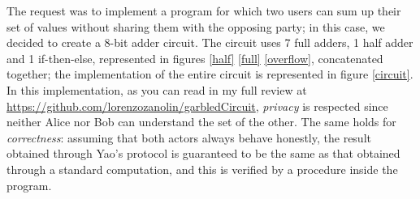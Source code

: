 \documentclass[12pt]{article}
\begin{document}
The request was to implement a program for which two users can sum up their set of values without sharing them with the opposing party; in this case, we decided to create a 8-bit adder circuit.
The circuit uses 7 full adders, 1 half adder and 1 if-then-else, represented in figures \ref{half} \ref{full} \ref{overflow}, concatenated together; the implementation of the entire circuit is represented in figure \ref{circuit}.
In this implementation, as you can read in my full review at \url{https://github.com/lorenzozanolin/garbledCircuit}\label{zanoGit}, \textit{privacy} is respected since neither Alice nor Bob can understand the set of the other. The same holds for \textit{correctness}: assuming that both actors always behave honestly, the result obtained through Yao's protocol is guaranteed to be the same as that obtained through a standard computation, and this is verified by a procedure inside the program.
\end{document}
